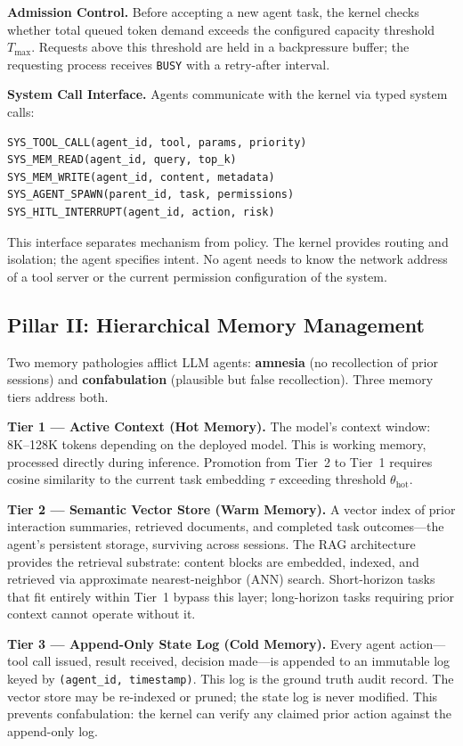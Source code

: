 \documentclass[journal]{IEEEtran}
\begin{document}
\textbf{Admission Control.} Before accepting a new agent task, the kernel checks whether total queued token demand exceeds the configured capacity threshold $T_{\max}$. Requests above this threshold are held in a backpressure buffer; the requesting process receives \texttt{BUSY} with a retry-after interval.

\textbf{System Call Interface.} Agents communicate with the kernel via typed system calls:

\begin{lstlisting}
SYS_TOOL_CALL(agent_id, tool, params, priority)
SYS_MEM_READ(agent_id, query, top_k)
SYS_MEM_WRITE(agent_id, content, metadata)
SYS_AGENT_SPAWN(parent_id, task, permissions)
SYS_HITL_INTERRUPT(agent_id, action, risk)
\end{lstlisting}

This interface separates mechanism from policy. The kernel provides routing and isolation; the agent specifies intent. No agent needs to know the network address of a tool server or the current permission configuration of the system.

\subsection{Pillar II: Hierarchical Memory Management}
\label{sec:memory}

Two memory pathologies afflict LLM agents: \textbf{amnesia} (no recollection of prior sessions) and \textbf{confabulation} (plausible but false recollection). Three memory tiers address both.

\textbf{Tier 1 — Active Context (Hot Memory).} The model's context window: 8K--128K tokens depending on the deployed model. This is working memory, processed directly during inference. Promotion from Tier~2 to Tier~1 requires cosine similarity to the current task embedding $\tau$ exceeding threshold $\theta_{\text{hot}}$.

\textbf{Tier 2 — Semantic Vector Store (Warm Memory).} A vector index of prior interaction summaries, retrieved documents, and completed task outcomes---the agent's persistent storage, surviving across sessions. The RAG architecture~\cite{lewis2020rag} provides the retrieval substrate: content blocks are embedded, indexed, and retrieved via approximate nearest-neighbor (ANN) search. Short-horizon tasks that fit entirely within Tier~1 bypass this layer; long-horizon tasks requiring prior context cannot operate without it.

\textbf{Tier 3 — Append-Only State Log (Cold Memory).} Every agent action---tool call issued, result received, decision made---is appended to an immutable log keyed by \texttt{(agent\_id, timestamp)}. This log is the ground truth audit record. The vector store may be re-indexed or pruned; the state log is never modified. This prevents confabulation: the kernel can verify any claimed prior action against the append-only log.
\end{document}
